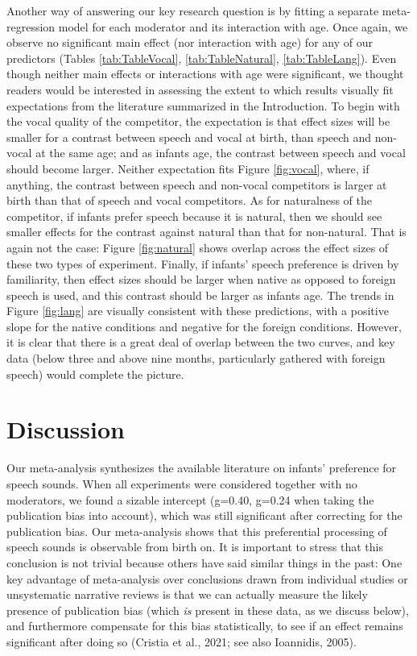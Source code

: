 \documentclass[
  man,mask,floatsintext]{apa6}
\begin{document}
Another way of answering our key research question is by fitting a separate meta-regression model for each moderator and its interaction with age. Once again, we observe no significant main effect (nor interaction with age) for any of our predictors (Tables \ref{tab:TableVocal}, \ref{tab:TableNatural}, \ref{tab:TableLang}). Even though neither main effects or interactions with age were significant, we thought readers would be interested in assessing the extent to which results visually fit expectations from the literature summarized in the Introduction. To begin with the vocal quality of the competitor, the expectation is that effect sizes will be smaller for a contrast between speech and vocal at birth, than speech and non-vocal at the same age; and as infants age, the contrast between speech and vocal should become larger. Neither expectation fits Figure \ref{fig:vocal}, where, if anything, the contrast between speech and non-vocal competitors is larger at birth than that of speech and vocal competitors. As for naturalness of the competitor, if infants prefer speech because it is natural, then we should see smaller effects for the contrast against natural than that for non-natural. That is again not the case: Figure \ref{fig:natural} shows overlap across the effect sizes of these two types of experiment. Finally, if infants' speech preference is driven by familiarity, then effect sizes should be larger when native as opposed to foreign speech is used, and this contrast should be larger as infants age. The trends in Figure \ref{fig:lang} are visually consistent with these predictions, with a positive slope for the native conditions and negative for the foreign conditions. However, it is clear that there is a great deal of overlap between the two curves, and key data (below three and above nine months, particularly gathered with foreign speech) would complete the picture.

\hypertarget{discussion}{%
\section{Discussion}\label{discussion}}

Our meta-analysis synthesizes the available literature on infants' preference for speech sounds. When all experiments were considered together with no moderators, we found a sizable intercept (g=0.40, g=0.24 when taking the publication bias into account), which was still significant after correcting for the publication bias. Our meta-analysis shows that this preferential processing of speech sounds is observable from birth on. It is important to stress that this conclusion is not trivial because others have said similar things in the past: One key advantage of meta-analysis over conclusions drawn from individual studies or unsystematic narrative reviews is that we can actually measure the likely presence of publication bias (which \emph{is} present in these data, as we discuss below), and furthermore compensate for this bias statistically, to see if an effect remains significant after doing so (Cristia et al., 2021; see also Ioannidis, 2005).
\end{document}
